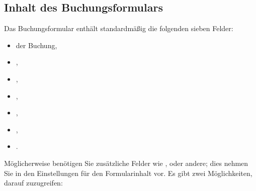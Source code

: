 \subsection{Inhalt des Buchungsformulars\label{transactions-form-content}}

Das Buchungsformular enthält standardmäßig die folgenden sieben Felder:
\begin{itemize}
	\item {} der Buchung,
	\item {},
	\item {},
	\item {},
	\item {},
	\item {},
	\item {}.
\end{itemize}
Möglicherweise benötigen Sie zusätzliche Felder wie ,  oder andere; dies nehmen Sie in den Einstellungen für den Formularinhalt vor. Es gibt zwei Möglichkeiten, darauf zuzugreifen:

